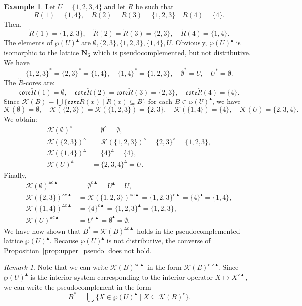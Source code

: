 \documentclass[11pt,a4paper]{amsart}
\newcommand{\UP}{\blacktriangle}
\newcommand{\Up}{\vartriangle}
\newcommand{\Down}{\triangledown}
\theoremstyle{plain}
\theoremstyle{definition}
\newtheorem{example}[theorem]{Example}
\theoremstyle{remark}
\newtheorem{remark}[theorem]{Remark}
\numberwithin{equation}{section}
\begin{document}
\begin{example}
Let $U = \{1, 2, 3, 4\}$ and let $R$ be such that 
\[ 
R(1) = \{1, 4\}, \quad R(2) = R(3) = \{1, 2, 3\} \quad R(4) = \{4\}.
\]
Then,
\[
\breve{R}(1) = \{1, 2, 3\}, \quad \breve{R}(2) = \breve{R}(3) = \{2, 3\}, \quad \breve{R}(4) = \{1, 4\}.
\]
The elements of $\wp(U)^\UP$ are $\emptyset, \{2, 3\}, \{1, 2, 3\}, \{1, 4\}, U$. Obviously, $\wp(U)^\UP$ is isomorphic to the lattice $\mathbf{N_5}$ 
which is pseudocomplemented, but not distributive. 
We have 
\[ \{1, 2, 3\}^* = \{2, 3\}^* = \{1, 4\}, \quad  \{1, 4\}^* = \{1, 2, 3\}, \quad \emptyset^* = U, \quad U^* = \emptyset. \] 
The $\breve{R}$-cores are:
\[
\mathfrak{core}\breve{R}(1) = \emptyset, \quad \mathfrak{core}\breve{R}(2) = \mathfrak{core}\breve{R}(3) = \{2, 3\}, \quad 
\mathfrak{core}\breve{R}(4) = \{4\}.
\]
Since $\mathcal{K}(B) = \bigcup 
\{ \mathfrak{core}\breve{R}(x) \mid \breve{R}(x) \subseteq B\}$ 
for each $B \in \wp(U)^\UP$, we have
\[
\mathcal{K}(\emptyset) = \emptyset, \quad 
\mathcal{K}(\{2, 3\}) = \mathcal{K}(\{1, 2, 3\}) = \{2, 3\}, \quad 
\mathcal{K}(\{1, 4\}) = \{4\}, \quad
\mathcal{K}(U) = \{2, 3, 4\}.
\]
We obtain:
\begin{align*}
\mathcal{K}(\emptyset)^\Up &= \emptyset^\Up = \emptyset, \\
\mathcal{K}(\{2, 3\})^\Up &= \mathcal{K}(\{1, 2, 3\})^\Up = 
\{2, 3\}^\Up = \{1, 2, 3\}, \\
\mathcal{K}(\{1, 4\})^\Up &= \{4\}^\Up = \{4\}, \\ 
\mathcal{K}(U)^\Up &= \{2, 3, 4\}^\Up = U.
\end{align*}
Finally,
\begin{align*}
\mathcal{K}(\emptyset)^{\Up c \UP} &= \emptyset^{c \UP} = U^\UP = U, \\ 
\mathcal{K}(\{2, 3\})^{\Up c \UP} &= \mathcal{K}(\{1, 2, 3\})^{\Up c \UP} = \{1, 2, 3\}^{c \UP} = \{4\}^\UP = \{1,4\}, \\ 
\mathcal{K}(\{1, 4\})^{\Up c \UP} &= \{4\}^{c \UP} = \{1,2,3\}^\UP = \{1,2,3\}, \\
\mathcal{K}(U)^{\Up c \UP} &=  U^{c \UP} = \emptyset^\UP = \emptyset.
\end{align*}
We have now shown that $B^* = \mathcal{K}(B)^{\Up c \UP}$ holds in the pseudocomplemented lattice $\wp(U)^\UP$.
Because  $\wp(U)^\UP$ is not distributive, the converse of Proposition~\ref{prop:upper_pseudo} does not hold. 
\end{example}

\begin{remark}
Note that we can write $\mathcal{K}(B)^{\Up c \UP}$ in the
form $\mathcal{K}(B)^{c\Down \UP}$. Since $\wp(U)^\UP$ is
the interior system corresponding to the interior operator
$X \mapsto X^{\Down \UP}$, we can write the pseudocomplement in
the form 
\begin{equation} \label{eq:pseudocomplement_upper}
B^* = \bigcup \{ X \in \wp(U)^\UP \mid X \subseteq \mathcal{K}(B)^c\}.
\end{equation}
\end{remark}
\end{document}
